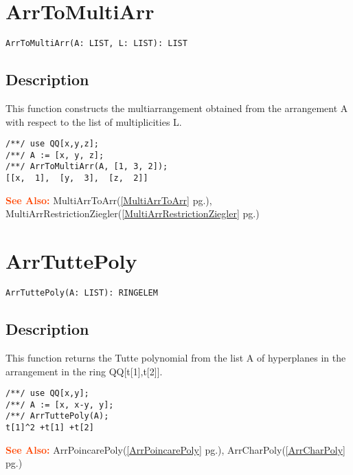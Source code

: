 \documentclass[a4paper]{mybook}
\newenvironment{command}{}{} %
\newcommand\SeeAlso{\par\textcolor{OrangeRed}{\textbf{\large See Also: }}}
\begin{document}
\section{ArrToMultiArr}
\label{ArrToMultiArr}
\begin{command} %


\begin{Verbatim}[label=syntax, rulecolor=\color{MidnightBlue},
frame=single]
ArrToMultiArr(A: LIST, L: LIST): LIST 
\end{Verbatim}


\subsection*{Description}

This function constructs the multiarrangement obtained from the
arrangement A with respect to the list of multiplicities L.
\begin{Verbatim}[label=example, rulecolor=\color{PineGreen}, frame=single]
/**/ use QQ[x,y,z];
/**/ A := [x, y, z];
/**/ ArrToMultiArr(A, [1, 3, 2]);
[[x,  1],  [y,  3],  [z,  2]]
\end{Verbatim}


\SeeAlso %
  MultiArrToArr(\ref{MultiArrToArr} pg.\pageref{MultiArrToArr}), 
    MultiArrRestrictionZiegler(\ref{MultiArrRestrictionZiegler} pg.\pageref{MultiArrRestrictionZiegler})
\end{command} %

\section{ArrTuttePoly}
\label{ArrTuttePoly}
\begin{command} %


\begin{Verbatim}[label=syntax, rulecolor=\color{MidnightBlue},
frame=single]
ArrTuttePoly(A: LIST): RINGELEM
\end{Verbatim}


\subsection*{Description}

This function returns the Tutte polynomial from the list A of
hyperplanes in the arrangement in the ring QQ[t[1],t[2]].

\begin{Verbatim}[label=example, rulecolor=\color{PineGreen}, frame=single]
/**/ use QQ[x,y];	
/**/ A := [x, x-y, y];
/**/ ArrTuttePoly(A);
t[1]^2 +t[1] +t[2]
\end{Verbatim}


\SeeAlso %
  ArrPoincarePoly(\ref{ArrPoincarePoly} pg.\pageref{ArrPoincarePoly}), 
    ArrCharPoly(\ref{ArrCharPoly} pg.\pageref{ArrCharPoly})
\end{command} %
\end{document}
